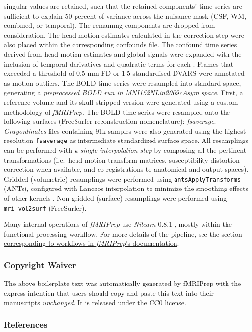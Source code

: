 \documentclass[
]{article}
\begin{document}
\begin{description}
singular values are retained, such that the retained components' time
series are sufficient to explain 50 percent of variance across the
nuisance mask (CSF, WM, combined, or temporal). The remaining components
are dropped from consideration. The head-motion estimates calculated in
the correction step were also placed within the corresponding confounds
file. The confound time series derived from head motion estimates and
global signals were expanded with the inclusion of temporal derivatives
and quadratic terms for each \citep{confounds_satterthwaite_2013}.
Frames that exceeded a threshold of 0.5 mm FD or 1.5 standardised DVARS
were annotated as motion outliers. The BOLD time-series were resampled
into standard space, generating a \emph{preprocessed BOLD run in
MNI152NLin2009cAsym space}. First, a reference volume and its
skull-stripped version were generated using a custom methodology of
\emph{fMRIPrep}. The BOLD time-series were resampled onto the following
surfaces (FreeSurfer reconstruction nomenclature): \emph{fsaverage}.
\emph{Grayordinates} files \citep{hcppipelines} containing 91k samples
were also generated using the highest-resolution \texttt{fsaverage} as
intermediate standardized surface space. All resamplings can be
performed with \emph{a single interpolation step} by composing all the
pertinent transformations (i.e.~head-motion transform matrices,
susceptibility distortion correction when available, and
co-registrations to anatomical and output spaces). Gridded (volumetric)
resamplings were performed using \texttt{antsApplyTransforms} (ANTs),
configured with Lanczos interpolation to minimize the smoothing effects
of other kernels \citep{lanczos}. Non-gridded (surface) resamplings were
performed using \texttt{mri\_vol2surf} (FreeSurfer).
\end{description}

Many internal operations of \emph{fMRIPrep} use \emph{Nilearn} 0.8.1
\citep[RRID:SCR\_001362]{nilearn}, mostly within the functional
processing workflow. For more details of the pipeline, see
\href{https://fmriprep.readthedocs.io/en/latest/workflows.html}{the
section corresponding to workflows in \emph{fMRIPrep}'s documentation}.

\hypertarget{copyright-waiver}{%
\subsubsection{Copyright Waiver}\label{copyright-waiver}}

The above boilerplate text was automatically generated by fMRIPrep with
the express intention that users should copy and paste this text into
their manuscripts \emph{unchanged}. It is released under the
\href{https://creativecommons.org/publicdomain/zero/1.0/}{CC0} license.

\hypertarget{references}{%
\subsubsection{References}\label{references}}

  
\end{document}
